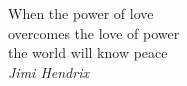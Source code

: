 \begin{titlepage}
\thispagestyle{empty}
\topmargin=6.5cm
\raggedleft
\large
When the power of love \\ overcomes the love of power \\ the world will know peace \\
\vspace{1 cm}
\normalsize
\textit{Jimi Hendrix}
\newpage
\clearpage{\pagestyle{empty}\cleardoublepage}
\end{titlepage}
